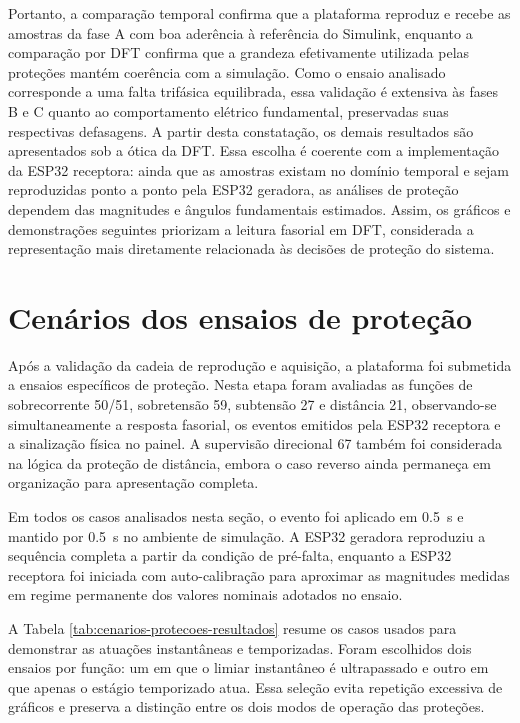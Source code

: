 Portanto, a comparação temporal confirma que a plataforma reproduz e recebe as amostras da fase A com boa aderência à referência do Simulink, enquanto a comparação por DFT confirma que a grandeza efetivamente utilizada pelas proteções mantém coerência com a simulação. Como o ensaio analisado corresponde a uma falta trifásica equilibrada, essa validação é extensiva às fases B e C quanto ao comportamento elétrico fundamental, preservadas suas respectivas defasagens. A partir desta constatação, os demais resultados são apresentados sob a ótica da DFT. Essa escolha é coerente com a implementação da ESP32 receptora: ainda que as amostras existam no domínio temporal e sejam reproduzidas ponto a ponto pela ESP32 geradora, as análises de proteção dependem das magnitudes e ângulos fundamentais estimados. Assim, os gráficos e demonstrações seguintes priorizam a leitura fasorial em DFT, considerada a representação mais diretamente relacionada às decisões de proteção do sistema.

\section{Cenários dos ensaios de proteção}

Após a validação da cadeia de reprodução e aquisição, a plataforma foi submetida a ensaios específicos de proteção. Nesta etapa foram avaliadas as funções de sobrecorrente 50/51, sobretensão 59, subtensão 27 e distância 21, observando-se simultaneamente a resposta fasorial, os eventos emitidos pela ESP32 receptora e a sinalização física no painel. A supervisão direcional 67 também foi considerada na lógica da proteção de distância, embora o caso reverso ainda permaneça em organização para apresentação completa.

Em todos os casos analisados nesta seção, o evento foi aplicado em \SI{0,5}{\second} e mantido por \SI{0,5}{\second} no ambiente de simulação. A ESP32 geradora reproduziu a sequência completa a partir da condição de pré-falta, enquanto a ESP32 receptora foi iniciada com auto-calibração para aproximar as magnitudes medidas em regime permanente dos valores nominais adotados no ensaio.

A Tabela \ref{tab:cenarios-protecoes-resultados} resume os casos usados para demonstrar as atuações instantâneas e temporizadas. Foram escolhidos dois ensaios por função: um em que o limiar instantâneo é ultrapassado e outro em que apenas o estágio temporizado atua. Essa seleção evita repetição excessiva de gráficos e preserva a distinção entre os dois modos de operação das proteções.

